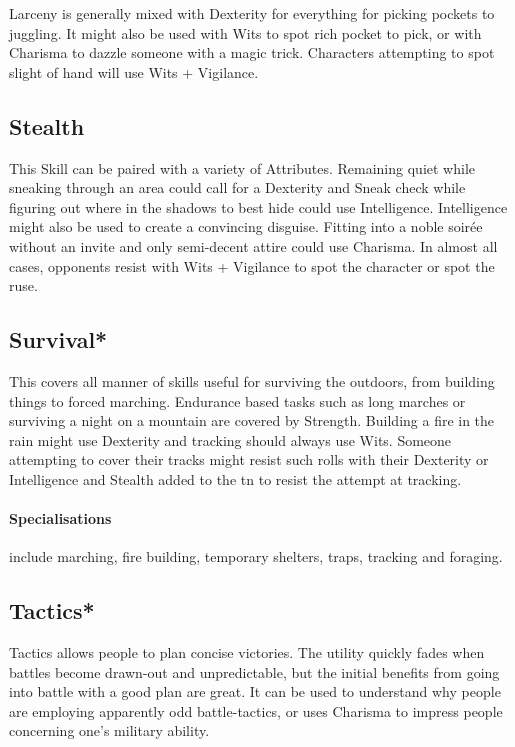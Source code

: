 \begin{multicols}{2}
Larceny is generally mixed with Dexterity for everything for picking pockets to juggling.
It might also be used with Wits to spot rich pocket to pick, or with Charisma to dazzle someone with a magic trick.
Characters attempting to spot slight of hand will use Wits + Vigilance.

\subsection{Stealth}

This Skill can be paired with a variety of Attributes.
Remaining quiet while sneaking through an area could call for a Dexterity and Sneak check while figuring out where in the shadows to best hide could use Intelligence.
Intelligence might also be used to create a convincing disguise.
Fitting into a noble soir\'{e}e without an invite and only semi-decent attire could use Charisma.
In almost all cases, opponents resist with Wits + Vigilance to spot the character or spot the ruse.

\subsection{Survival*}

This covers all manner of skills useful for surviving the outdoors, from building things to forced marching. Endurance based tasks such as long marches or surviving a night on a mountain are covered by Strength. Building a fire in the rain might use Dexterity and tracking should always use Wits. Someone attempting to cover their tracks might resist such rolls with their Dexterity or Intelligence and Stealth added to the \gls{tn} to resist the attempt at tracking.

\paragraph{Specialisations} include marching, fire building, temporary shelters, traps, tracking and foraging.

\subsection{Tactics*}

Tactics allows people to plan concise victories.
The utility quickly fades when battles become drawn-out and unpredictable, but the initial benefits from going into battle with a good plan are great.
It can be used to understand why people are employing apparently odd battle-tactics, or uses Charisma to impress people concerning one's military ability.


\end{multicols}
